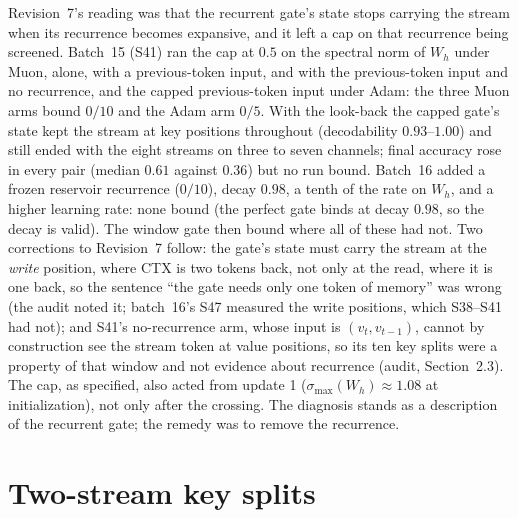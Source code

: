 \documentclass[11pt]{article}
\begin{document}
Revision~7's reading was that the recurrent gate's state stops carrying the stream when its recurrence becomes expansive, and it left a cap on that recurrence being screened. Batch~15 (S41) ran the cap at $0.5$ on the spectral norm of $W_h$ under Muon, alone, with a previous-token input, and with the previous-token input and no recurrence, and the capped previous-token input under Adam: the three Muon arms bound $0/10$ and the Adam arm $0/5$. With the look-back the capped gate's state kept the stream at key positions throughout (decodability $0.93$--$1.00$) and still ended with the eight streams on three to seven channels; final accuracy rose in every pair (median $0.61$ against $0.36$) but no run bound. Batch~16 added a frozen reservoir recurrence ($0/10$), decay $0.98$, a tenth of the rate on $W_h$, and a higher learning rate: none bound (the perfect gate binds at decay $0.98$, so the decay is valid). The window gate then bound where all of these had not. Two corrections to Revision~7 follow: the gate's state must carry the stream at the \emph{write} position, where CTX is two tokens back, not only at the read, where it is one back, so the sentence ``the gate needs only one token of memory'' was wrong (the audit noted it; batch~16's S47 measured the write positions, which S38--S41 had not); and S41's no-recurrence arm, whose input is $(v_t, v_{t-1})$, cannot by construction see the stream token at value positions, so its ten key splits were a property of that window and not evidence about recurrence (audit, Section~2.3). The cap, as specified, also acted from update 1 ($\sigma_{\max}(W_h) \approx 1.08$ at initialization), not only after the crossing. The diagnosis stands as a description of the recurrent gate; the remedy was to remove the recurrence.

\section{Two-stream key splits}
\label{sec:keysplits}
\end{document}
